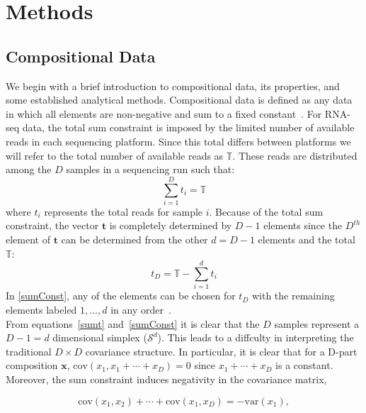 \documentclass{article}\usepackage[]{graphicx}\usepackage[]{color}
\begin{document}

\section{Methods}
\subsection{Compositional Data}
We begin with a brief introduction to compositional data, its properties, and some established analytical methods.  Compositional data is defined as any data in which all elements are non-negative and sum to a fixed constant~\cite{Aitchison1986}. %
For RNA-seq data, the total sum constraint is imposed by the limited number of available reads in each sequencing platform.  Since this total differs between platforms we will refer to the total number of available reads as $\mathbb{T}$. These reads are distributed among the $D$ samples in a sequencing run such that:
\begin{equation}
\sum_{i=1}^{D} t_i = \mathbb{T}
\label{sumt}
\end{equation}
where $t_i$ represents the total reads for sample $i$.  Because of the total sum constraint, the vector $\mathbf{t}$ is completely determined by $D-1$ elements since the $D^{th}$ element of $\mathbf{t}$ can be determined from the other $d = D-1$ elements and the total $\mathbb{T}$:  
\begin{equation}
t_D = \mathbb{T} - \sum_{i=1}^{d} t_i
\label{sumConst}
\end{equation}
In \ref{sumConst}, any of the elements can be chosen for $t_D$ with the remaining elements labeled $1, ..., d$ in any order~\cite{Aitchison1986}.  \\

From equations~\ref{sumt} and~\ref{sumConst} it is clear that the $D$ samples represent a $D - 1 = d$ dimensional simplex ($\mathcal{S}^d$). This leads to a diffculty in interpreting the traditional $D \times D$ covariance structure.  In particular, it is clear that for a D-part composition $\mathbf{x}$, $\text{cov}(x_1, x_1+ \cdots +x_D) = 0$  since $x_1 + \cdots + x_D$ is a constant.  Moreover, the sum constraint induces negativity in the covariance matrix,

\begin{equation}
\text{cov}(x_1, x_2) + \cdots + \text{cov}(x_1, x_D) = -\text{var}(x_1),
\label{negbias}
\end{equation}
\end{document}
